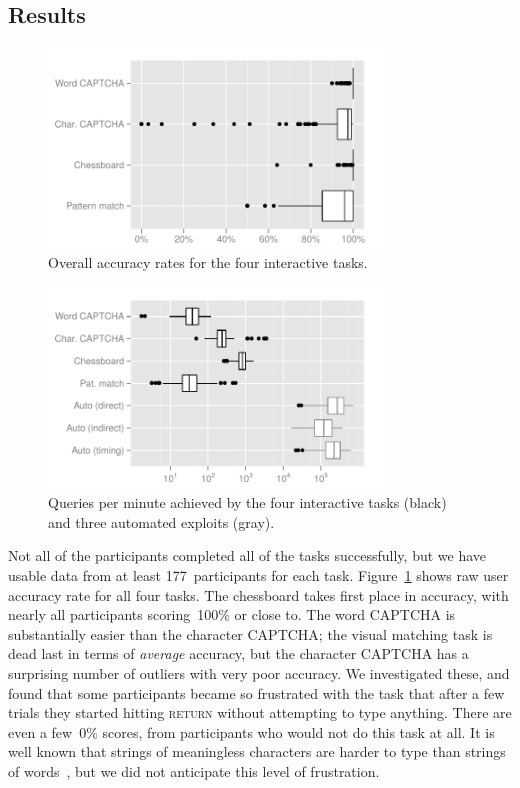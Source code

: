 \documentclass[conference]{IEEEtran}
\begin{document}
\subsection{Results}\label{sec:results}

\begin{figure}
\centerline{\includegraphics[width=3.5in]{accuracy}}
\caption{Overall accuracy rates for the four interactive
  tasks.}\label{fig:accuracy}
\end{figure}

\begin{figure}
\centerline{\includegraphics[width=3.5in]{qpm}}
\caption{Queries per minute achieved by the four interactive tasks
  (black) and three automated exploits (gray).}\label{fig:qpm}
\end{figure}

Not all of the participants completed all of the tasks successfully,
but we have usable data from at least 177~participants for each task.
Figure~\ref{fig:accuracy} shows raw user accuracy rate for all four
tasks.  The chessboard takes first place in accuracy, with nearly all
participants scoring~100\% or close to.  The word CAPTCHA is
substantially easier than the character CAPTCHA; the visual matching
task is dead last in terms of \emph{average} accuracy, but the
character CAPTCHA has a surprising number of outliers with very poor
accuracy.  We investigated these, and found that some participants
became so frustrated with the task that after a few trials they
started hitting \textsc{return} without attempting to type anything.
There are even a few~0\% scores, from participants who would not do
this task at all.  It is well known that strings of meaningless
characters are harder to type than strings of
words~\cite{hershman1965typing}, but we did not anticipate this level
of frustration.
\end{document}
